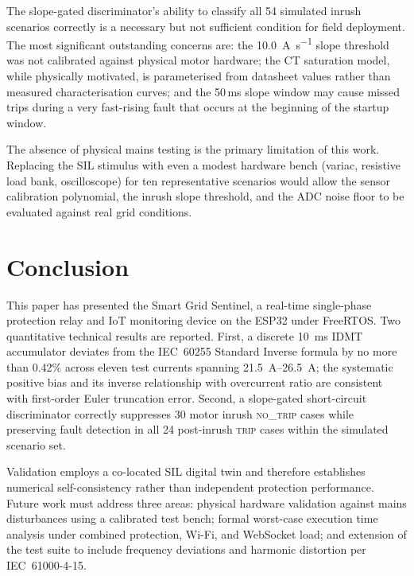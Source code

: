 \documentclass[conference]{IEEEtran}
\begin{document}
The slope-gated discriminator's ability to classify all 54 simulated
inrush scenarios correctly is a necessary but not sufficient condition
for field deployment.  The most significant outstanding concerns are:
the \SI{10.0}{\ampere\per\second} slope threshold was not calibrated
against physical motor hardware; the CT saturation model, while
physically motivated, is parameterised from datasheet values rather
than measured characterisation curves; and the 50\,ms slope window
may cause missed trips during a very fast-rising fault that occurs at
the beginning of the startup window.

The absence of physical mains testing is the primary limitation of this
work.  Replacing the SIL stimulus with even a modest hardware bench
(variac, resistive load bank, oscilloscope) for ten representative
scenarios would allow the sensor calibration polynomial, the inrush
slope threshold, and the ADC noise floor to be evaluated against real
grid conditions.

\section{Conclusion}

This paper has presented the Smart Grid Sentinel, a real-time
single-phase protection relay and IoT monitoring device on the ESP32
under FreeRTOS.  Two quantitative technical results are reported.
First, a discrete \SI{10}{\milli\second} IDMT accumulator deviates from
the IEC~60255 Standard Inverse formula by no more than 0.42\% across
eleven test currents spanning \SIrange{21.5}{26.5}{\ampere}; the
systematic positive bias and its inverse relationship with overcurrent
ratio are consistent with first-order Euler truncation error.  Second,
a slope-gated short-circuit discriminator correctly suppresses 30
motor inrush \textsc{no\_trip} cases while preserving fault detection
in all 24 post-inrush \textsc{trip} cases within the simulated
scenario set.

Validation employs a co-located SIL digital twin and therefore
establishes numerical self-consistency rather than independent
protection performance.  Future work must address three areas: physical
hardware validation against mains disturbances using a calibrated test
bench; formal worst-case execution time analysis under combined
protection, Wi-Fi, and WebSocket load; and extension of the test suite
to include frequency deviations and harmonic distortion per
IEC~61000-4-15.
\end{document}
